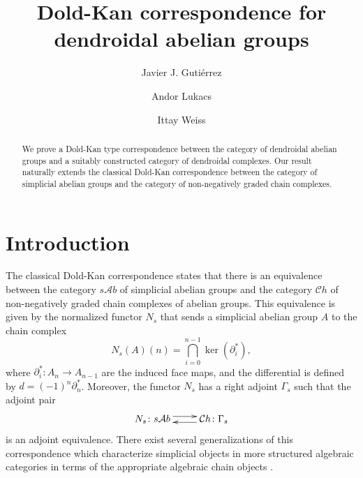 \documentclass[a4paper]{amsart}
\theoremstyle{plain}
\theoremstyle{definition}
\theoremstyle{remark}
\newcommand{\A}{\mathcal{A}b}
\newcommand{\Ch}{\mathcal{C}h}
\numberwithin{equation}{section}
\numberwithin{figure}{section}
\begin{document}
\title[Dold-Kan correspondence for dendroidal abelian groups]{Dold-Kan correspondence for \\ dendroidal abelian groups}

\author[J. J. Guti\'errez]{Javier J. Guti\'errez}
\address{Centre de Recerca Matem\`atica, Apartat 50, 08193 Bellaterra (Barcelona), Spain}
\author[A. Lukacs]{Andor Lukacs}
\author[I. Weiss]{Ittay Weiss}
\address{Mathematisch Instituut, Postbus 80.010, 3508 TA Utrecht, The Netherlands}


 

\begin{abstract}
    We prove a Dold-Kan type correspondence between the category of
    dendroidal abelian groups and a suitably constructed category of
    dendroidal complexes. Our result naturally extends the classical
    Dold-Kan correspondence between the category of simplicial abelian
    groups and the category of non-negatively graded chain complexes.
\end{abstract}

\maketitle

\section{Introduction}
The classical Dold-Kan correspondence \cite{dold, kan} states that there is an
equivalence between the category $s\A$ of simplicial abelian groups
and the category $\Ch$ of non-negatively graded chain complexes of
abelian groups. This equivalence is given by the normalized functor
$N_s$ that sends a simplicial abelian group $A$ to the chain complex
$$
    N_s(A)(n)=\bigcap_{i=0}^{n-1}\ker(\partial_i^*),
$$
where $\partial_i^*\colon A_n\longrightarrow A_{n-1}$ are the induced face maps, and the differential is defined by $d=(-1)^n\partial_n^*$. Moreover, the
functor $N_s$ has a right adjoint $\Gamma_s$ such that the adjoint pair
$$
    \xymatrix{
        N_s\colon s\A \ar@<3pt>[r] & \ar@<3pt>[l] \Ch\colon \Gamma_s
    }
$$
is an adjoint equivalence. There exist several generalizations of
this correspondence which characterize simplicial objects in more
structured algebraic categories in terms of the appropriate
algebraic chain objects \cite{pirashvili, slominska}.
\end{document}
